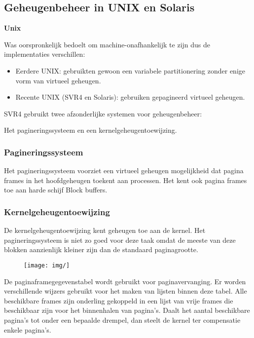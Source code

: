 \subsection{Geheugenbeheer in UNIX en Solaris }

\textbf{Unix}

Was oorspronkelijk bedoelt om machine-onafhankelijk te zijn dus de implementaties verschillen:

\begin{itemize}
\item Eerdere UNIX: gebruikten gewoon een variabele partitionering zonder enige vorm van virtueel geheugen.
\item Recente UNIX (SVR4 en Solaris): gebruiken gepagineerd virtueel geheugen.
\end{itemize}

SVR4 gebruikt twee afzonderlijke systemen voor geheugenbeheer: 

Het pagineringssysteem en een kernelgeheugentoewijzing.

\subsubsection{Pagineringssysteem}

Het pagineringssysteem voorziet een virtueel geheugen mogelijkheid dat pagina frames in het hoofdgeheugen toekent aan processen. Het kent ook pagina frames toe aan harde schijf Block buffers.

\subsubsection{Kernelgeheugentoewijzing}

De kernelgeheugentoewijzing kent geheugen toe aan de kernel. Het pagineringssysteem is niet zo goed voor deze taak omdat de meeste van deze blokken aanzienlijk kleiner zijn dan de standaard paginagrootte.

\begin{figure}[htp]
    \centering
            \texttt{[image: img/]}
        \caption{}
    \label{fig:}
\end{figure}

De paginaframegegevenstabel wordt gebruikt voor paginavervanging. Er worden verschillende wijzers gebruikt voor het maken van lijsten binnen deze tabel. Alle beschikbare frames zijn onderling gekoppeld in een lijst van vrije frames die beschikbaar zijn voor het binnenhalen van pagina’s. Daalt het aantal beschikbare pagina’s tot onder een bepaalde drempel, dan steelt de kernel ter compensatie enkele pagina’s.

